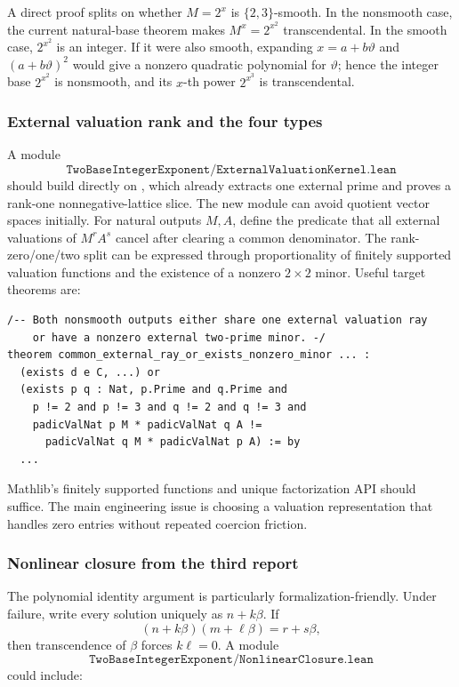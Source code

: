 \documentclass[11pt,oneside]{article}
\theoremstyle{definition}
\theoremstyle{remark}
\newcommand{\lean}[1]{\path{#1}}
\begin{document}
A direct proof splits on whether $M=2^x$ is $\{2,3\}$-smooth.  In the nonsmooth case, the
current natural-base theorem makes $M^x=2^{x^2}$ transcendental.  In the smooth case,
$2^{x^2}$ is an integer.  If it were also smooth, expanding
$x=a+b\vartheta$ and $(a+b\vartheta)^2$ would give a nonzero quadratic polynomial for
$\vartheta$; hence the integer base $2^{x^2}$ is nonsmooth, and its $x$-th power
$2^{x^3}$ is transcendental.

\subsubsection{External valuation rank and the four types}

A module
\[
 \texttt{TwoBaseIntegerExponent/ExternalValuationKernel.lean}
\]
should build directly on \lean{AlgebraicOutputLocus}, which already extracts one external
prime and proves a rank-one nonnegative-lattice slice.  The new module can avoid quotient
vector spaces initially.  For natural outputs $M,A$, define the predicate
that all external valuations of $M^rA^s$ cancel after clearing a common denominator.  The
rank-zero/one/two split can be expressed through proportionality of finitely supported
valuation functions and the existence of a nonzero $2\times2$ minor.  Useful target theorems
are:

\begin{lstlisting}[style=leanstyle]
/-- Both nonsmooth outputs either share one external valuation ray
    or have a nonzero external two-prime minor. -/
theorem common_external_ray_or_exists_nonzero_minor ... :
  (exists d e C, ...) or
  (exists p q : Nat, p.Prime and q.Prime and
    p != 2 and p != 3 and q != 2 and q != 3 and
    padicValNat p M * padicValNat q A !=
      padicValNat q M * padicValNat p A) := by
  ...
\end{lstlisting}

Mathlib's finitely supported functions and unique factorization API should suffice.  The main
engineering issue is choosing a valuation representation that handles zero entries without
repeated coercion friction.

\subsubsection{Nonlinear closure from the third report}

The polynomial identity argument is particularly formalization-friendly.  Under failure,
write every solution uniquely as $n+k\beta$.  If
\[
 (n+k\beta)(m+\ell\beta)=r+s\beta,
\]
then transcendence of $\beta$ forces $k\ell=0$.  A module
\[
 \texttt{TwoBaseIntegerExponent/NonlinearClosure.lean}
\]
could include:
\end{document}
